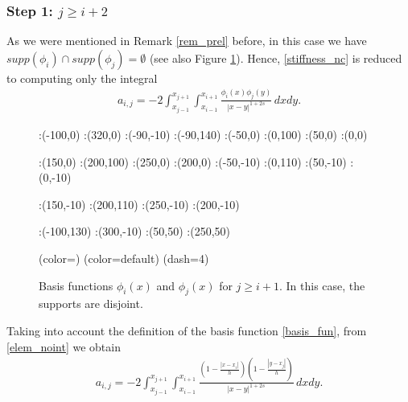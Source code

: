 \subsubsection*{Step 1: $j\geq i+2$}
As we were mentioned in Remark \ref{rem_prel} before, in this case we have $supp(\phi_i)\cap supp(\phi_j) =\emptyset$ (see also Figure \ref{basis_upp_tri}). Hence, \eqref{stiffness_nc} is reduced to computing only the integral
\begin{align}\label{elem_noint}
	a_{i,j}=-2 \int_{x_{j-1}}^{x_{j+1}}\int_{x_{i-1}}^{x_{i+1}}\frac{\phi_i(x)\phi_j(y)}{|x-y|^{1+2s}}\,dxdy.
\end{align}

\begin{figure}[h]
\figinit{0.8pt}
:(-100,0) :(320,0)
:(-90,-10) :(-90,140)
:(-50,0) :(0,100) 
:(50,0) :(0,0)

:(150,0) :(200,100) 
:(250,0) :(200,0)
%
:(-50,-10) :(0,110) 
:(50,-10) :(0,-10)

:(150,-10) :(200,110) 
:(250,-10) :(200,-10)

:(-100,130) :(300,-10)
:(50,50) :(250,50)

\figdrawbegin{}
\figdrawarrow[1,2]
\figdrawline[3,4]
\figdrawline[4,5]
\figset (color=\Redrgb)
\figdrawline[31,41]
\figdrawline[41,51]
\figset (color=default)
\figset(dash=4)
\figdrawline[4,6]
\figdrawline[41,61]
\figdrawarrow[11,12]

\figdrawend

\centerline{\box\figBoxA}
\caption{Basis functions $\phi_i(x)$ and $\phi_j(x)$ for $j\geq i+1$. In this case, the supports are disjoint.}\label{basis_upp_tri}
\end{figure}

Taking into account the definition of the basis function \eqref{basis_fun}, from \eqref{elem_noint} we obtain
\begin{align*}
	a_{i,j}=-2 \int_{x_{j-1}}^{x_{j+1}}\int_{x_{i-1}}^{x_{i+1}}\frac{\left(1-\frac{|x-x_i|}{h}\right)\left(1-\frac{|y-x_j|}{h}\right)}{|x-y|^{1+2s}}\,dxdy.
\end{align*}

